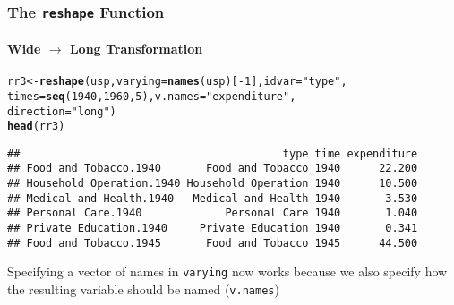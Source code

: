 \documentclass[paper=screen,mathserif]{beamer}\usepackage[]{graphicx}\usepackage[]{color}
\makeatletter
\newcommand{\hlnum}[1]{\textcolor[rgb]{0.686,0.059,0.569}{#1}}%
\newcommand{\hlstr}[1]{\textcolor[rgb]{0.192,0.494,0.8}{#1}}%
\newcommand{\hlopt}[1]{\textcolor[rgb]{0,0,0}{#1}}%
\newcommand{\hlstd}[1]{\textcolor[rgb]{0.345,0.345,0.345}{#1}}%
\newcommand{\hlkwb}[1]{\textcolor[rgb]{0.69,0.353,0.396}{#1}}%
\newcommand{\hlkwc}[1]{\textcolor[rgb]{0.333,0.667,0.333}{#1}}%
\newcommand{\hlkwd}[1]{\textcolor[rgb]{0.737,0.353,0.396}{\textbf{#1}}}%
\newenvironment{kframe}{%
 \def\at@end@of@kframe{}%
 \ifinner\ifhmode%
  \def\at@end@of@kframe{\end{minipage}}%
  \begin{minipage}{\columnwidth}%
 \fi\fi%
 \def\FrameCommand##1{\hskip\@totalleftmargin \hskip-\fboxsep
 \colorbox{shadecolor}{##1}\hskip-\fboxsep
     \hskip-\linewidth \hskip-\@totalleftmargin \hskip\columnwidth}%
 \MakeFramed {\advance\hsize-\width
   \@totalleftmargin\z@ \linewidth\hsize
   \@setminipage}}%
 {\par\unskip\endMakeFramed%
 \at@end@of@kframe}
\newenvironment{knitrout}{}{} %
\newcommand{\ft}[1]{\frametitle{#1}}
\newcommand{\fst}[1]{\framesubtitle{#1}}
\makeatother
\begin{document}
\begin{frame}[fragile]
  \ft{The {\tt reshape} Function}
  \fst{Wide $\rightarrow$ Long Transformation}
\begin{knitrout}\scriptsize
{}\color{fgcolor}\begin{kframe}
\begin{alltt}
\hlstd{rr3} \hlkwb{<-} \hlkwd{reshape}\hlstd{(usp,} \hlkwc{varying} \hlstd{=} \hlkwd{names}\hlstd{(usp)[}\hlopt{-}\hlnum{1}\hlstd{],} \hlkwc{idvar} \hlstd{=} \hlstr{"type"}\hlstd{,}
               \hlkwc{times} \hlstd{=} \hlkwd{seq}\hlstd{(}\hlnum{1940}\hlstd{,} \hlnum{1960}\hlstd{,} \hlnum{5}\hlstd{),} \hlkwc{v.names} \hlstd{=} \hlstr{"expenditure"}\hlstd{,}
               \hlkwc{direction} \hlstd{=} \hlstr{"long"}\hlstd{)}
\hlkwd{head}\hlstd{(rr3)}
\end{alltt}
\begin{verbatim}
##                                         type time expenditure
## Food and Tobacco.1940       Food and Tobacco 1940      22.200
## Household Operation.1940 Household Operation 1940      10.500
## Medical and Health.1940   Medical and Health 1940       3.530
## Personal Care.1940             Personal Care 1940       1.040
## Private Education.1940     Private Education 1940       0.341
## Food and Tobacco.1945       Food and Tobacco 1945      44.500
\end{verbatim}
\end{kframe}
\end{knitrout}

\pause

Specifying a vector of names in \verb=varying= now works because we
also specify how the resulting variable should be named
(\verb=v.names=)
\end{frame}
\end{document}
